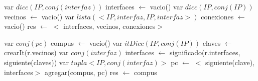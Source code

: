 \disFuncionDeAbsFuncionesAux
{}
\mbox{}

\mbox{}

\mbox{}


\disAlgoritmos
\begin{algorithm}\phantom{[H]}
\begin{algorithmic}[1]
 
  \State var $dicc(IP, conj(interfaz))$ interfaces $\gets$ vacio() 
  \State var $dicc(IP, conj(IP))$ vecinos $\gets$ vacio() 
  \State var $lista(<IP, interfaz, IP, interfaz>)$ conexiones $\gets$ vacio() 
  \State res $\gets$ $<$ interfaces, vecinos, conexiones$>$ 
  
\EndFunction
\end{algorithmic}
\end{algorithm}

\begin{algorithm}\phantom{[H]}
\begin{algorithmic}[1]
 
  \State var $conj(pc)$ compus $\gets$ vacio() 
  \State var $itDicc(IP,conj(IP))$ claves $\gets$ crearIt(r.vecinos) 
   
      \State var $conj(interfaz)$ interfaces $\gets$ significado(r.interfaces, siguiente(claves)) 
      \State var $tupla<IP,conj(interfaz)>$ pc $\gets$ $<$ siguiente(clave), interfaces$>$ 
      \State agregar(compus, pc) 
  \EndWhile
    \State res $\gets$ compus 
\EndFunction
\end{algorithmic}
\end{algorithm}

